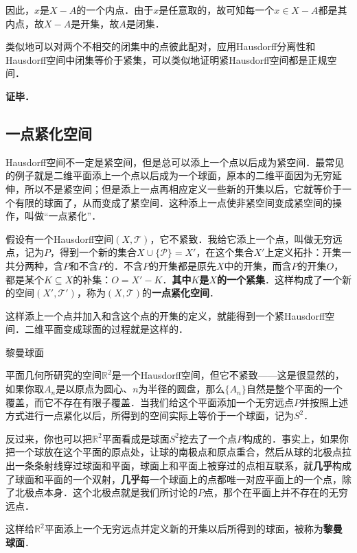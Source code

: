 因此，$x$是$X-A$的一个内点．由于$x$是任意取的，故可知每一个$x\in X-A$都是其内点，故$X-A$是开集，故$A$是闭集．

类似地可以对两个不相交的闭集中的点彼此配对，应用Hausdorff分离性和Hausdorff空间中闭集等价于紧集，可以类似地证明紧Hausdorff空间都是正规空间．


\textbf{证毕．}

\subsection{一点紧化空间}

Hausdorff空间不一定是紧空间，但是总可以添上一个点以后成为紧空间．最常见的例子就是二维平面添上一个点以后成为一个球面，原本的二维平面因为无穷延伸，所以不是紧空间；但是添上一点再相应定义一些新的开集以后，它就等价于一个有限的球面了，从而变成了紧空间．这种添上一点使非紧空间变成紧空间的操作，叫做“一点紧化”．

假设有一个Hausdorff空间$(X, \mathcal{T})$，它不紧致．我给它添上一个点，叫做无穷远点，记为$P$，得到一个新的集合$X\cup \{\mathcal{P}\}=X'$，在这个集合$X'$上定义拓扑：开集一共分两种，含$P$和不含$P$的．不含$P$的开集都是原先$X$中的开集，而含$P$的开集$O$，都是某个$K\subseteq X$的补集：$O=X'-K$．\textbf{其中$K$是$X$的一个紧集}．这样构成了一个新的空间$(X', \mathcal{T}')$，称为$(X, \mathcal{T})$的\textbf{一点紧化空间}．

这样添上一个点并加入和含这个点的开集的定义，就能得到一个紧Hausdorff空间．二维平面变成球面的过程就是这样的．

\begin{example}{黎曼球面}

平面几何所研究的空间$\mathbb{R}^2$是一个Hausdorff空间，但它不紧致——这是很显然的，如果你取$A_n$是以原点为圆心、$n$为半径的圆盘，那么$\{A_n\}$自然是整个平面的一个覆盖，而它不存在有限子覆盖．当我们给这个平面添加一个无穷远点$P$并按照上述方式进行一点紧化以后，所得到的空间实际上等价于一个球面，记为$S^2$．

反过来，你也可以把$\mathbb{R}^2$平面看成是球面$S^2$挖去了一个点$P$构成的．事实上，如果你把一个球放在这个平面的原点处，让球的南极点和原点重合，然后从球的北极点拉出一条条射线穿过球面和平面，球面上和平面上被穿过的点相互联系，就\textbf{几乎}构成了球面和平面的一个双射，\textbf{几乎}每一个球面上的点都唯一对应平面上的一个点，除了北极点本身．这个北极点就是我们所讨论的$P$点，那个在平面上并不存在的无穷远点．

这样给$\mathbb{R}^2$平面添上一个无穷远点并定义新的开集以后所得到的球面，被称为\textbf{黎曼球面}．


\end{example}
